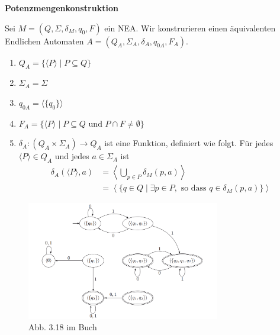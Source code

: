 \documentclass[a4paper, 11pt]{article}
\begin{document}
    
    
        \textbf{Potenzmengenkonstruktion}
        \begin{subbox}{}
            Sei $M = (Q, \Sigma, \delta_M, q_0, F)$ ein NEA. Wir konstrurieren einen äquivalenten Endlichen Automaten $A = (Q_A, \Sigma_A, \delta_A, q_{0A}, F_A)$.
            \begin{enumerate}[label = (\roman*)]
                \item $Q_A = \{\langle P \rangle \mid P \subseteq Q\}$
                \item $\Sigma_A = \Sigma$
                \item $q_{0A} = \langle\{q_0\}\rangle$
                \item $F_A = \{\langle P\rangle \mid P \subseteq Q \text{ und } P \cap F \neq \emptyset\}$
                \item $\delta_A: (Q_A \times \Sigma_A) \to Q_A$ ist eine Funktion, definiert wie folgt. Für  jedes $\langle P \rangle \in Q_A$ und jedes $a \in \Sigma_A$ ist 
                \begin{align*}
                    \delta_A(\langle P \rangle, a) &= \left\langle \bigcup_{p \in P} \delta_M(p, a) \right\rangle\\
                    &= \left\langle\{q \in Q \mid \exists p \in P, \text{ so dass }q \in \delta_{M}(p, a)\}\right\rangle
                \end{align*}
            \end{enumerate}
        \end{subbox}
    
        \begin{figure}[htp]
            \centering
            \includegraphics[width=0.75\textwidth]{Images/Potenzmengenkonstruktion_Beispiel.png}
            \caption{Abb. 3.18 im Buch}
        \end{figure}
    
    
    
\end{document}
